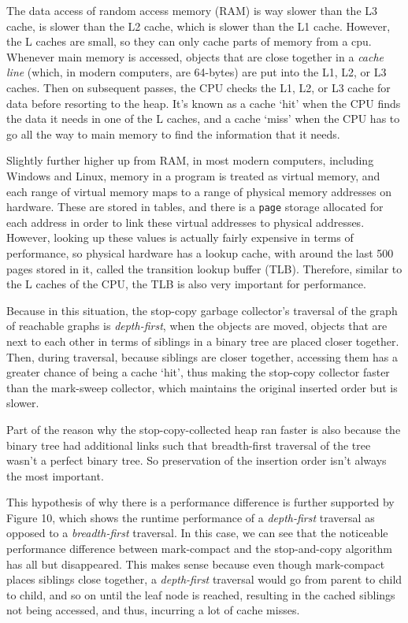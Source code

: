 \documentclass[index]{subfiles}
\begin{document}
The data access of random access memory (RAM) is way slower than the L3 cache, is slower than the L2 cache, which is slower than the L1 cache\cite{simondevCanJavaScriptGo2021}. However, the L caches are small, so they can only cache parts of memory from a cpu. Whenever main memory is accessed, objects that are close together in a \textit{cache line} (which, in modern computers, are 64-bytes) are put into the L1, L2, or L3 caches. Then on subsequent passes, the CPU checks the L1, L2, or L3 cache for data before resorting to the heap. It's known as a cache `hit' when the CPU finds the data it needs in one of the L caches, and a cache `miss'\cite{simondevCanJavaScriptGo2021} when the CPU has to go all the way to main memory to find the information that it needs.

Slightly further higher up from RAM, in most modern computers, including Windows and Linux, memory in a program is treated as virtual memory, and each range of virtual memory maps to a range of physical memory addresses on hardware\cite{code_project}. These are stored in tables, and there is a \verb+page+ storage allocated for each address in order to link these virtual addresses to physical addresses. However, looking up these values is actually fairly expensive in terms of performance, so physical hardware has a lookup cache, with around the last 500 pages stored in it, called the transition lookup buffer (TLB)\cite{code_project}. Therefore, similar to the L caches of the CPU, the TLB is also very important for performance. 

 Because in this situation, the stop-copy garbage collector's traversal of the graph of reachable graphs is \textit{depth-first}, when the objects are moved, objects that are next to each other in terms of siblings in a binary tree are placed closer together. Then, during traversal, because siblings are closer together, accessing them has a greater chance of being a cache `hit', thus making the stop-copy collector faster than the mark-sweep collector, which maintains the original inserted order but is slower.
 
 Part of the reason why the stop-copy-collected heap ran faster is also because the binary tree had additional links such that breadth-first traversal of the tree wasn't a perfect binary tree. So preservation of the insertion order isn't always the most important. 
 
 This hypothesis of why there is a performance difference is further supported by Figure 10, which shows the runtime performance of a \textit{depth-first} traversal as opposed to a \textit{breadth-first} traversal. In this case, we can see that the noticeable performance difference between mark-compact and the stop-and-copy algorithm has all but disappeared. This makes sense because even though mark-compact places siblings close together, a \textit{depth-first} traversal would go from parent to child to child, and so on until the leaf node is reached, resulting in the cached siblings not being accessed, and thus, incurring a lot of cache misses.
\end{document}
